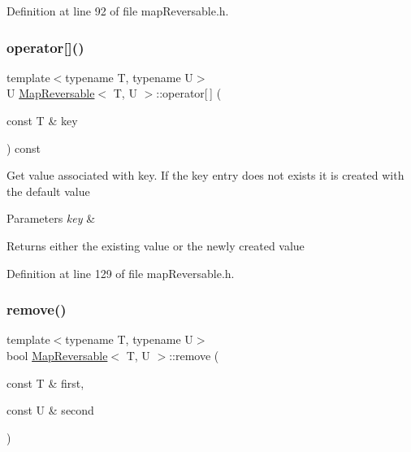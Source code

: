 Definition at line 92 of file map\+Reversable.\+h.

\mbox{\label{classMapReversable_a71cb9601304a81fa70fff861ce25180a}} 
\subsubsection{\texorpdfstring{operator[]()}{operator[]()}}
{\footnotesize\ttfamily template$<$typename T, typename U$>$ \\
U \hyperlink{classMapReversable}{Map\+Reversable}$<$ T, U $>$\+::operator\mbox{[}$\,$\mbox{]} (\begin{DoxyParamCaption}\item[{const T \&}]{key }\end{DoxyParamCaption}) const\hspace{0.3cm}{\ttfamily [inline]}}

Get value associated with key. If the key entry does not exists it is created with the default value 
\begin{DoxyParams}{Parameters}
{\em key} & \\
\hline
\end{DoxyParams}
\begin{DoxyReturn}{Returns}
either the existing value or the newly created value 
\end{DoxyReturn}


Definition at line 129 of file map\+Reversable.\+h.

\mbox{\label{classMapReversable_aa4338f7c831e5a404758f88e80d13672}} 
\subsubsection{\texorpdfstring{remove()}{remove()}\hspace{0.1cm}{\footnotesize\ttfamily [1/2]}}
{\footnotesize\ttfamily template$<$typename T, typename U$>$ \\
bool \hyperlink{classMapReversable}{Map\+Reversable}$<$ T, U $>$\+::remove (\begin{DoxyParamCaption}\item[{const T \&}]{first,  }\item[{const U \&}]{second }\end{DoxyParamCaption})\hspace{0.3cm}{\ttfamily [inline]}}

